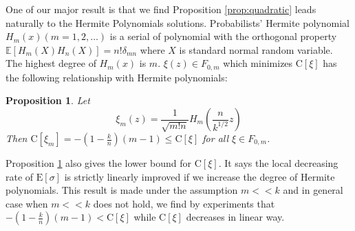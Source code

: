 \documentclass[conference]{IEEEtran}
\newtheorem{proposition}{Proposition}
\def\E{\mathbb{E}}
\begin{document}
One of our major result is that we find Proposition \ref{prop:quadratic} leads naturally to the Hermite Polynomials solutions. Probabilists' Hermite polynomial $H_m(x) (m=1,2,\dots)$ is a serial of polynomial with the orthogonal property $ \E[H_m(X)H_n(X)] = n! \delta_{mn}$ where $X$ is standard normal random variable.
The highest degree of $H_m(x)$ is $m$. $\xi(z) \in F_{0, m}$ which minimizes $\mathrm{C}[\xi]$ has the following relationship with Hermite polynomials:
\begin{proposition}\label{prop:value}
Let
\begin{equation}\label{eq:ximopt}
    \xi_m(z) = \frac{1}{\sqrt{m!n}} H_m(\frac{n}{k^{1/2}} z)
\end{equation}
Then $\mathrm{C}[\xi_m] = -(1-\frac{k}{n})(m-1) \leq \mathrm{C}[\xi] $ for all $\xi \in F_{0, m}$.
\end{proposition}
Proposition \ref{prop:value} also gives the lower bound for $\mathrm{C}[\xi]$.
It says the local decreasing rate of $\mathrm{E}[\sigma]$ is strictly linearly improved if we increase the degree of Hermite polynomials. This result is made under the assumption $ m << k$ and in general case when $ m << k$ does not hold, we find by experiments that $-(1-\frac{k}{n})(m-1) < \mathrm{C}[\xi]$ while $\mathrm{C}[\xi]$ decreases in linear way.



\end{document}

